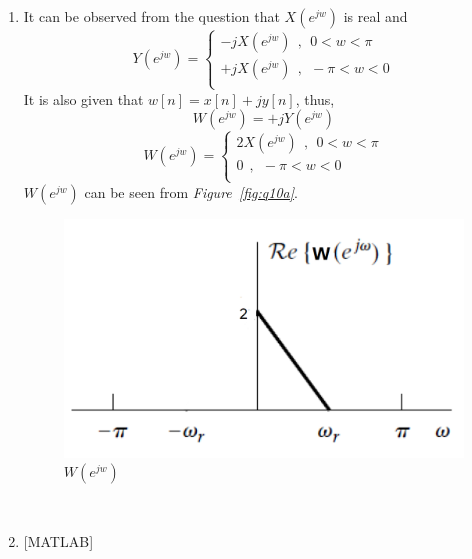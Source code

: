 \documentclass[a4paper,12pt]{article}
\begin{document}
\begin{enumerate}
	\item It can be observed from the question that $X(e^{jw})$ is real and
	$$ Y(e^{jw})= \begin{cases}
     			-jX(e^{jw}) ~~,~~ 0<w<\pi \\
     			+jX(e^{jw}) ~~,~~ -\pi<w<0\\
     		\end{cases} $$
     		It is also given that $w[n]=x[n]+jy[n]$, thus,
     		$$ W(e^{jw})=+jY(e^{jw})$$ 
			$$\boxed{ W(e^{jw})= \begin{cases}
     			2X(e^{jw})~~, ~~ 0<w<\pi \\
     			0 ~~,~~ -\pi<w<0\\
     		\end{cases} }$$
     		$W(e^{jw})$ can be seen from \textit{Figure~\ref{fig:q10a}}.
     		\begin{figure}[H]
					\centering
					\setlength{\unitlength}{\textwidth} 
					\includegraphics[width=0.6\unitlength]{q11a}
					\caption{\label{fig:q11a} $W(e^{jw})$  }
				\end{figure}
	\-\\[2cm]
	\item {[MATLAB]} 
		

\end{enumerate}
\end{document}

